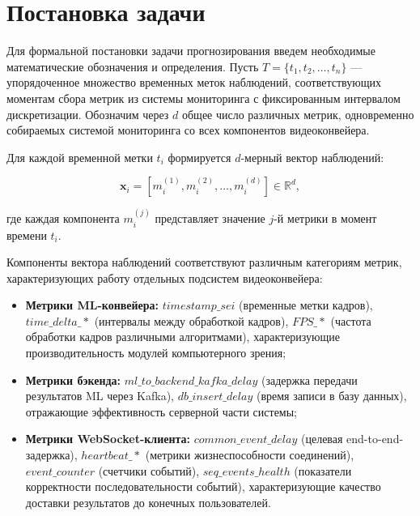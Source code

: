 \section{Постановка задачи}

\hspace*{1.25cm}Для формальной постановки задачи прогнозирования введем необходимые математические обозначения и определения. Пусть $T=\{t_1, t_2, \ldots, t_n\}$ --- упорядоченное множество временных меток наблюдений, соответствующих моментам сбора метрик из системы мониторинга с фиксированным интервалом дискретизации. Обозначим через $d$ общее число различных метрик, одновременно собираемых системой мониторинга со всех компонентов видеоконвейера.

\hspace*{1.25cm}Для каждой временной метки $t_i$ формируется $d$-мерный вектор наблюдений:

\begin{equation}
	\mathbf{x}_i = [m^{(1)}_i, m^{(2)}_i, \ldots, m^{(d)}_i] \in \mathbb{R}^d,
\end{equation}

где каждая компонента $m^{(j)}_i$ представляет значение $j$-й метрики в момент времени $t_i$.

\hspace*{1.25cm}Компоненты вектора наблюдений соответствуют различным категориям метрик, характеризующих работу отдельных подсистем видеоконвейера:

\begin{itemize}
	\item \textbf{Метрики ML-конвейера:} $timestamp\_sei$ (временные метки кадров), $time\_delta\_*$ (интервалы между обработкой кадров), $FPS\_*$ (частота обработки кадров различными алгоритмами), характеризующие производительность модулей компьютерного зрения;
	\item \textbf{Метрики бэкенда:} $ml\_to\_backend\_kafka\_delay$ (задержка передачи результатов ML через Kafka), $db\_insert\_delay$ (время записи в базу данных), отражающие эффективность серверной части системы;
	\item \textbf{Метрики WebSocket-клиента:} $common\_event\_delay$ (целевая end-to-end-задержка), $heartbeat\_*$ (метрики жизнеспособности соединений), $event\_counter$ (счетчики событий), $seq\_events\_health$ (показатели корректности последовательности событий), характеризующие качество доставки результатов до конечных пользователей.
\end{itemize}

